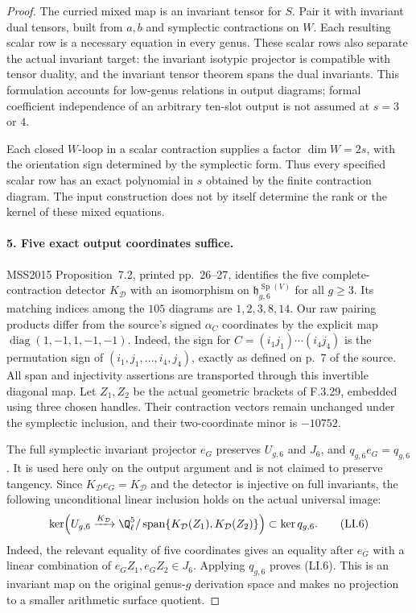 \begin{proof}
The curried mixed map is an invariant tensor for $S$.
Pair it with invariant dual tensors, built from $a,b$
and symplectic contractions on $W$. Each resulting scalar
row is a necessary equation in every genus. These scalar
rows also separate the actual invariant target: the
invariant isotypic projector is compatible with tensor
duality, and the invariant tensor theorem spans the dual
invariants. This formulation accounts for low-genus
relations in output diagrams; formal coefficient
independence of an arbitrary ten-slot output is not
assumed at $s=3$ or $4$.

Each closed $W$-loop in a scalar contraction supplies a
factor $\dim W=2s$, with the orientation sign determined
by the symplectic form. Thus every specified scalar
row has an exact polynomial in $s$ obtained by the
finite contraction diagram. The input construction
does not by itself determine the rank or the kernel
of these mixed equations.

\paragraph{5. Five exact output coordinates suffice.}
MSS2015 Proposition~7.2, printed pp.~26--27\cite{AuditMoritaSakasaiSuzuki2015v2}, identifies
the five complete-contraction detector $K_{\mathcal D}$
with an isomorphism on
$\mathfrak h_{g,6}^{\operatorname{Sp}(V)}$ for all $g\geq3$.
Its matching indices among the $105$ diagrams are
$1,2,3,8,14$. Our raw pairing products differ from the
source's signed $\alpha_C$ coordinates by the explicit map
$\operatorname{diag}(1,-1,1,-1,-1)$. Indeed, the sign for
$C=(i_1j_1)\cdots(i_4j_4)$ is the permutation sign of
$(i_1,j_1,\ldots,i_4,j_4)$, exactly as defined on p.~7
of the source. All span and injectivity assertions are
transported through this invertible diagonal map. Let $Z_1,Z_2$ be the actual geometric
brackets of F.3.29, embedded using three chosen handles.
Their contraction vectors remain unchanged under the
symplectic inclusion, and their two-coordinate minor
is $-10752$.

The full symplectic invariant projector $e_G$ preserves
$U_{g,6}$ and $J_6$, and $q_{g,6}e_G=q_{g,6}$.
It is used here only on the output argument and is not
claimed to preserve tangency. Since $K_{\mathcal D}e_G
=K_{\mathcal D}$ and the detector is injective on full
invariants, the following unconditional linear inclusion
holds on the actual universal image:
\[
 \ker\!\left(U_{g,6}\xrightarrow{K_{\mathcal D}}
  \Q_\ell^5/\operatorname{span}\{K_{\mathcal D}(Z_1),
                                      K_{\mathcal D}(Z_2)\}\right)
                 \subset\ker q_{g,6}.                    \tag{LI.6}
\]
Indeed, the relevant equality of five coordinates gives
an equality after $e_G$ with a linear combination of
$e_GZ_1,e_GZ_2\in J_6$. Applying $q_{g,6}$ proves (LI.6).
This is an invariant map on the original genus-$g$
derivation space and makes no projection to a smaller
arithmetic surface quotient.


\end{proof}
